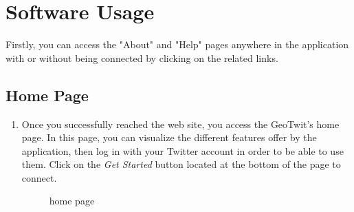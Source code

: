 \documentclass[a4paper,11pt]{report}
\begin{document}
\section{Software Usage}
Firstly, you can access the "About" and "Help" pages anywhere in the application with or without being connected by clicking on the related links.

\subsection{Home Page}
\begin{enumerate}
	\item Once you successfully reached the web site, you access the GeoTwit's home page. In this page, you can visualize the different features offer by the application, then log in with your Twitter account in order to be able to use them. Click on the \emph{Get Started} button located at the bottom of the page to connect.
	\begin{figure}[H]
	\vspace{-5pt}
	\begin{center}
	\vspace{-5pt}
	\caption{home page}
	\end{center}
	\end{figure}
	\vspace{-10pt}
	\newpage


\end{enumerate}
\end{document}

